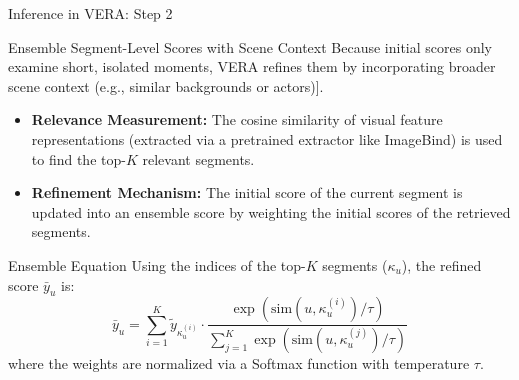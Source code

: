 \documentclass[aspectratio=169,xcolor=dvipsnames]{beamer}
\begin{document}
	
	\begin{frame}{Inference in VERA: Step 2}
		\small
		
		\begin{block}{Ensemble Segment-Level Scores with Scene Context}
			Because initial scores only examine short, isolated moments, VERA refines them by incorporating broader scene context (e.g., similar backgrounds or actors)].
		\end{block}
		
		\begin{itemize}
			\item \textbf{Relevance Measurement:} The cosine similarity of visual feature representations (extracted via a pretrained extractor like ImageBind) is used to find the top-$K$ relevant segments.
			\item \textbf{Refinement Mechanism:} The initial score of the current segment is updated into an ensemble score by weighting the initial scores of the retrieved segments.
		\end{itemize}
		
		\begin{block}{Ensemble Equation}
			Using the indices of the top-$K$ segments ($\kappa_u$), the refined score $\bar{y}_u$ is:
			\[
			\bar{y}_u = \sum_{i=1}^{K} \tilde{y}_{\kappa_u^{(i)}} \cdot \frac{\exp(\mathrm{sim}(u, \kappa_u^{(i)})/\tau)}{\sum_{j=1}^{K} \exp(\mathrm{sim}(u, \kappa_u^{(j)})/\tau)}
			\]
			where the weights are normalized via a Softmax function with temperature $\tau$.
		\end{block}
	\end{frame}
	
\end{document}
